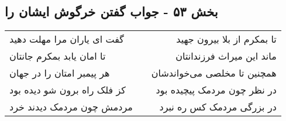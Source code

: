 \begin{center}
\section*{بخش ۵۳ - جواب گفتن خرگوش ایشان را}
\label{sec:sh053}
\begin{longtable}{l p{0.5cm} r}
گفت ای یاران مرا مهلت دهید
&&
تا بمکرم از بلا بیرون جهید
\\
تا امان یابد بمکرم جانتان
&&
ماند این میراث فرزندانتان
\\
هر پیمبر امتان را در جهان
&&
همچنین تا مخلصی می‌خواندشان
\\
کز فلک راه برون شو دیده بود
&&
در نظر چون مردمک پیچیده بود
\\
مردمش چون مردمک دیدند خرد
&&
در بزرگی مردمک کس ره نبرد
\\
\end{longtable}
\end{center}
